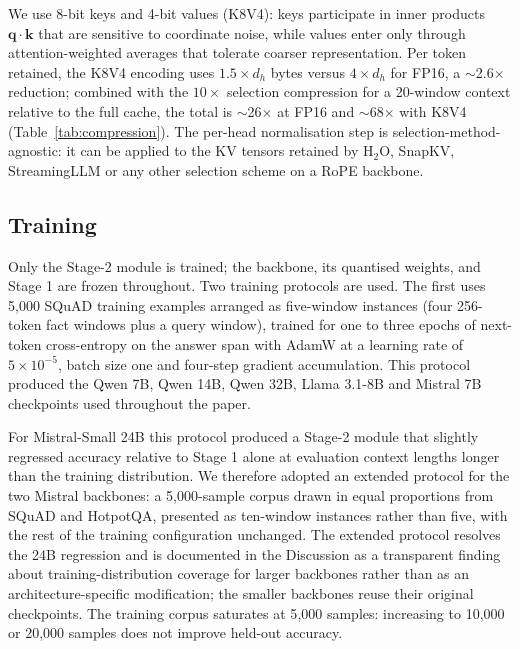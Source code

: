 We use 8-bit keys and 4-bit values (K8V4): keys participate in inner
products $\mathbf{q}\cdot\mathbf{k}$ that are sensitive to coordinate
noise, while values enter only through attention-weighted averages
that tolerate coarser representation. Per token retained, the K8V4
encoding uses $1.5\times d_h$ bytes versus $4\times d_h$ for FP16, a
$\sim$2.6$\times$ reduction; combined with the $10\times$ selection
compression for a 20-window context relative to the full cache, the
total is $\sim$26$\times$ at FP16 and $\sim$68$\times$ with K8V4
(Table~\ref{tab:compression}). The per-head normalisation step is
selection-method-agnostic: it can be applied to the KV tensors
retained by H${}_2$O, SnapKV, StreamingLLM or any other selection
scheme on a RoPE backbone.


\subsection{Training}\label{sec:training}

Only the Stage-2 module is trained; the backbone, its quantised
weights, and Stage 1 are frozen throughout. Two training protocols are
used. The first uses 5{,}000 SQuAD training
examples\cite{rajpurkar2016squad} arranged as five-window instances
(four 256-token fact windows plus a query window), trained for one
to three epochs of next-token cross-entropy on the answer span with
AdamW at a learning rate of $5\times10^{-5}$, batch size one and
four-step gradient accumulation. This protocol produced the Qwen 7B,
Qwen 14B, Qwen 32B, Llama 3.1-8B and Mistral 7B checkpoints used
throughout the paper.

For Mistral-Small 24B this protocol produced a Stage-2 module that
slightly regressed accuracy relative to Stage 1 alone at evaluation
context lengths longer than the training distribution. We therefore
adopted an extended protocol for the two Mistral backbones: a
5{,}000-sample corpus drawn in equal proportions from SQuAD and
HotpotQA, presented as ten-window instances rather than five, with the
rest of the training configuration unchanged. The extended protocol
resolves the 24B regression and is documented in the Discussion as a
transparent finding about training-distribution coverage for larger
backbones rather than as an architecture-specific modification; the
smaller backbones reuse their original checkpoints. The training corpus
saturates at 5{,}000 samples: increasing to 10{,}000 or 20{,}000
samples does not improve held-out accuracy.



